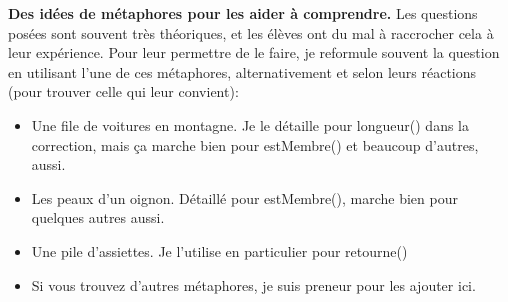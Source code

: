 \documentclass[10pt]{article}\usepackage[correction,nu]{esial}
\begin{document}
\begin{Reponse}
  \textbf{Des idées de métaphores pour les aider à comprendre.} Les questions
  posées sont souvent très théoriques, et les élèves ont du mal à raccrocher
  cela à leur expérience. Pour leur permettre de le faire, je reformule souvent
  la question en utilisant l'une de ces métaphores, alternativement et selon
  leurs réactions (pour trouver celle qui leur convient):
  \begin{itemize}
  \item Une file de voitures en montagne. Je le détaille pour longueur() dans la
    correction, mais ça marche bien pour estMembre() et beaucoup d'autres,
    aussi.
  \item Les peaux d'un oignon. Détaillé pour estMembre(), marche bien pour
    quelques autres aussi.
  \item Une pile d'assiettes. Je l'utilise en particulier pour retourne()
  \item Si vous trouvez d'autres métaphores, je suis preneur pour les ajouter
    ici.
  \end{itemize}
\end{Reponse}
\end{document}

